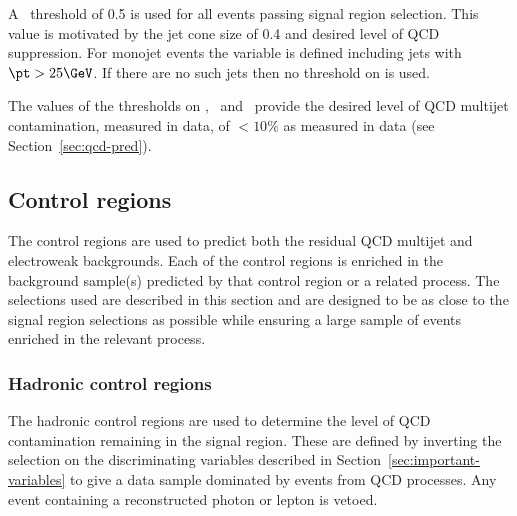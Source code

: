 A \bdphi~threshold of 0.5 is used for all events passing signal region selection.
This value is motivated by the jet cone size of 0.4 and desired level of 
QCD suppression. For monojet events the \bdphi variable is defined including jets with 
$\pt > 25 \GeV$. If there are no such jets then no threshold on \bdphi is used.

The values of the thresholds on \alphat, \bdphi~and \mhtmet~provide the desired 
level of QCD multijet contamination, measured in data, of $< 10\%$
as measured in data (see Section~\ref{sec:qcd-pred}).
%
%

\subsection{Control regions}
\label{sec:cr-sel}
The control regions are used to predict both the residual QCD multijet
and electroweak backgrounds. Each of the control regions is enriched 
in the background sample(s) predicted by that control region or a related 
process. The selections used are described in this section and are designed to 
be as close to the signal region selections as possible 
while ensuring a large sample of events enriched in the relevant process. 

\subsubsection{Hadronic control regions}
The hadronic control regions are used to determine the level of QCD contamination
remaining in the signal region. These are defined by inverting the selection on the 
discriminating variables described in Section~\ref{sec:important-variables} to give a data sample 
dominated by events from QCD processes. Any event containing a reconstructed photon or lepton is vetoed.

